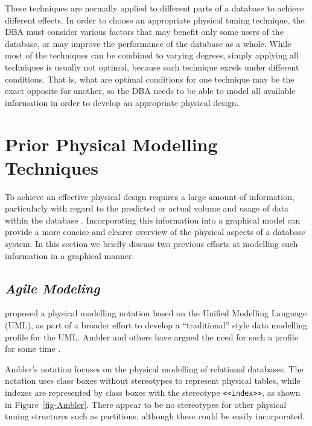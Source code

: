\documentclass{CRPITStyle}
\begin{document}
These techniques are normally applied to different parts of a database
to achieve different effects. In order to choose an appropriate physical
tuning technique, the DBA must consider various factors that may benefit
only some users of the database, or may improve the performance of the
database as a whole. While most of the techniques can be combined to
varying degrees, simply applying all techniques is usually not optimal,
because each technique excels under different conditions. That is, what
are optimal conditions for one technique may be the exact opposite for
another, so the DBA needs to be able to model all available information
in order to develop an appropriate physical design.



\section{Prior Physical Modelling Techniques}
\label{sec-previous}

To achieve an effective physical design requires a large amount of
information, particularly with regard to the predicted or actual volume
and usage of data within the database \cite{BeDa-P-2003}. Incorporating
this information into a graphical model can provide a more concise and
clearer overview of the physical aspects of a database system. In this
section we briefly discuss two previous efforts at modelling such
information in a graphical manner.


\subsection{\emph{Agile Modeling}}

\citeyear{Ambl-SW-2003-ADT,Ambl-SW-2004-ObjPrimer3} proposed a physical
modelling notation based on the Unified Modelling Language (UML), as
part of a broader effort to develop a ``traditional'' style data
modelling profile for the UML. Ambler and others have argued the need
for such a profile for some time
\cite{Ambl-SW-1998-BOA,Naib-EJ-2001-UMLDD}.

Ambler's notation focuses on the physical modelling of relational
databases. The notation uses class boxes without stereotypes to
represent physical tables, while indexes are represented by class boxes
with the stereotype \verb|<<index>>|, as shown in
Figure~\ref{fig-Ambler}. There appear to be no stereotypes for other
physical tuning structures such as partitions, although these could be
easily incorporated.
\end{document}
